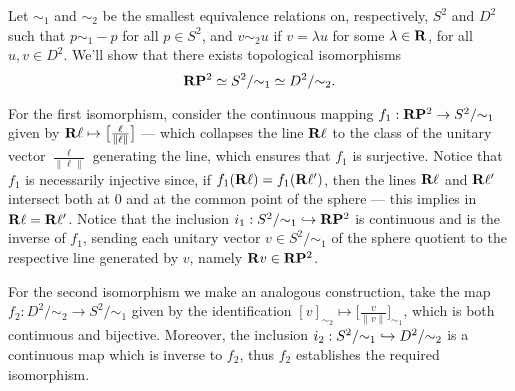 


\begin{example}
\label{exp:RP2-iso-S2-D2}
Let \(\sim_1\) and \(\sim_2\) be the smallest equivalence relations on,
respectively, \(S^2\) and \(D^2\) such that \(p \sim_1 -p\) for all
\(p \in S^2\), and \(v \sim_2 u\) if \(v = \lambda u\) for some
\(\lambda \in \mathbf{R}\), for all \(u, v \in D^2\). We'll show that there exists
topological isomorphisms
\[
\mathbf{R} \mathbf{P}^2 \simeq S^2/{\sim_1} \simeq D^2/{\sim_2}.
\]

For the first isomorphism, consider the continuous mapping
\(f_1: \mathbf{R} \mathbf{P}^2 \to S^2/{\sim_1}\) given by
\(\mathbf{R} \ell \mapsto \big[ \frac{\ell}{\| \ell \|}\big]\) --- which collapses the
line \(\mathbf{R} \ell\) to the class of the unitary vector \(\frac{\ell}{\| \ell \|}\)
generating the line, which ensures that \(f_1\) is surjective. Notice that
\(f_1\) is necessarily injective since, if \(f_1(\mathbf{R} \ell) = f_1(\mathbf{R} \ell')\),
then the lines \(\mathbf{R} \ell\) and \(\mathbf{R} \ell'\) intersect both at \(0\) and at the
common point of the sphere --- this implies in \(\mathbf{R} \ell = \mathbf{R} \ell'\). Notice
that the inclusion \(i_1: S^2/{\sim_1} \hookrightarrow \mathbf{R} \mathbf{P}^2\) is continuous and is
the inverse of \(f_1\), sending each unitary vector \(v \in S^2/{\sim_1}\) of
the sphere quotient to the respective line generated by \(v\), namely
\(\mathbf{R} v \in \mathbf{R} \mathbf{P}^2\).

For the second isomorphism we make an analogous construction, take the map
\(f_2: D^2/{\sim_2} \to S^2/{\sim_1}\) given by the identification
\([v]_{\sim_2} \mapsto \big[ \frac{v}{\| v \|} \big]_{\sim_1}\), which is both
continuous and bijective. Moreover, the inclusion
\(i_2: S^2/{\sim_1} \hookrightarrow D^2/{\sim_2}\) is a continuous map which is inverse to
\(f_2\), thus \(f_2\) establishes the required isomorphism.
\end{example}

